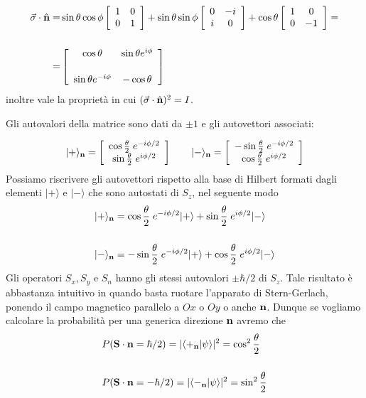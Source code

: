 \begin{align*}
	\vec{\sigma} \cdot \hat{\bold{n}} = & \sin\theta \cos \phi \left [ \begin{array}{cc} 1 & 0 \\ 0 & 1\end{array}\right ] + \sin \theta \sin \phi \left [ \begin{array}{cc} 0 & -i \\ i & 0\end{array}\right ] + \cos \theta \left [ \begin{array}{cc} 1 & 0 \\ 0 & -1\end{array}\right ] = \\[0.5cm]
	= &\left [ \begin{array}{cc}
		\cos \theta &  \sin \theta e^{i\phi} \\[0.5cm]
		\sin \theta e^{-i\phi} & - \cos \theta 
	\end{array} \right ] 
\end{align*}
inoltre vale la propriet\`a in cui $(\vec{\sigma} \cdot \hat{\bold{n}})^2 = I$. 
\newpage 

Gli autovalori della matrice sono dati da $\pm 1$ e gli autovettori associati:

\begin{equation*}
	|+ \rangle_{\bold{n}} = \left [ \begin{array}{c}
		\cos \frac{\theta}{2} \; e^{-i\phi/2}\\
		\sin \frac{\theta}{2} \; e^{i\phi/2}
	\end{array}\right] \quad \quad |- \rangle_{\bold{n}} = \left [\begin{array}{c}
		- \sin \frac{\theta}{2} \; e^{-i\phi/2} \\
		\cos \frac{\theta}{2} \; e^{i \phi/2}
	\end{array} \right]
\end{equation*}
Possiamo riscrivere gli autovettori rispetto alla base di Hilbert formati dagli elementi $|+ \rangle $ e $|- \rangle$ che sono autostati di $S_z$, nel seguente modo
\begin{align*}
	&|+ \rangle_{\bold{n}} = \cos \frac{\theta}{2} \; e^{-i\phi/2} |+ \rangle + \sin \frac{\theta}{2} \; e^{i\phi/2} |-\rangle \\[0.5cm]
	&|- \rangle_{\bold{n}} =   - \sin \frac{\theta}{2} \; e^{-i\phi/2} |+ \rangle + \cos \frac{\theta}{2} \; e^{i \phi/2}|- \rangle 
\end{align*}
Gli operatori $S_x,S_y$ e $S_n$ hanno gli stessi autovalori $\pm \hbar /2$ di $S_z$. Tale risultato \`e abbastanza intuitivo in quando basta ruotare l'apparato di Stern-Gerlach, ponendo il campo magnetico parallelo a $Ox$ o $Oy$ o anche $\bold{n}$. Dunque se vogliamo calcolare la probabilit\`a per una generica direzione $\bold{n}$ avremo che 
\begin{align*}
	& P(\bold{S} \cdot \bold{n} = \hbar /2 ) = |\langle +_{\bold{n}} | \psi \rangle |^2 = \cos^2 \frac{\theta }{2} \\[0.5cm]
	& P(\bold{S} \cdot \bold{n} = - \hbar /2) = |\langle -_{\bold{n}} | \psi \rangle |^2= \sin^2 \frac{\theta }{2} 
\end{align*}

